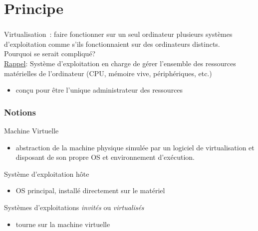 \section{Principe}
\begin{frame}
\frametitle{\insertsection}
\alert{Virtualisation}~: faire fonctionner sur un seul ordinateur plusieurs systèmes
d'exploitation comme s'ils fonctionnaient sur des ordinateurs distincts. \\
\vspace{0.5cm}
\pause
Pourquoi se serait compliqué? \\
\pause
\vspace{0.5cm}
\underline{Rappel}:
Système d’exploitation en charge de gérer l'ensemble des ressources
matérielles de l’ordinateur (CPU, mémoire vive, périphériques, etc.)
\begin{itemize}
\item[\ding{212}] conçu pour être l'unique administrateur des ressources
\end{itemize}
\vspace{0.5cm}
\end{frame}

\begin{frame}
\frametitle{Notions}
Machine Virtuelle
\begin{itemize}
\item abstraction de la machine physique simulée par un logiciel de virtualisation et
  disposant de son propre OS et environnement d'exécution.
\end{itemize}
\vspace{0.5cm}
Système d'exploitation hôte 
\begin{itemize}
\item OS principal, installé directement sur le matériel 
\end{itemize}
\vspace{0.5cm}
Systèmes d'exploitations \emph{invités} ou \emph{virtualisés}
\begin{itemize}
\item tourne sur la machine virtuelle
\end{itemize}
\end{frame}

